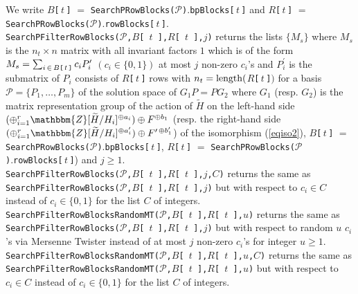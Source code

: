 \documentclass{amsart}
\theoremstyle{plain}
\theoremstyle{definition}
\theoremstyle{remark}
\newcommand{\bZ}{\mathbbm{Z}}\newcommand{\bQ}{\mathbbm{Q}}
\newcounter{sub}\def\tr{\mbox{tr }}
\begin{document}
We write 
$B${\tt [}\,$t$\,{\tt ]} $=$ {\tt SearchPRowBlocks($\mathcal{P}$)}.{\tt bpBlocks[}\,$t$\,{\tt ]} and 
$R${\tt [}\,$t$\,{\tt ]} $=$ {\tt SearchPRowBlocks($\mathcal{P}$)}.{\tt rowBlocks[}\,$t$\,{\tt ]}.\\

\noindent 
{\tt SearchPFilterRowBlocks($\mathcal{P}$,$B${\tt [}\,$t$\,{\tt ]},$R${\tt [}\,$t$\,{\tt ]},$j$)} 
returns 
the lists $\{M_s\}$ where $M_s$ is the $n_t \times n$ matrix 
with all invariant factors $1$ which is of the form 
$M_s=\sum_{i\,\in\,B\mbox{\tt\scriptsize [}\,t\,\mbox{\tt\scriptsize ]}} c_i P_i^\prime$ $(c_i\in\{0,1\})$ 
at most $j$ non-zero $c_i$'s 
and 
$P_i^\prime$ is the submatrix of $P_i$ consists of 
$R${\tt [}\,$t$\,{\tt ]} rows 
with $n_t={\rm length}($$R${\tt [}\,$t$\,{\tt ]}$)$ 
%
for a basis $\mathcal{P}=\{P_1,\dots,P_m\}$ 
of the solution space of $G_1P=PG_2$ 
where $G_1$ (resp. $G_2$) is the matrix representation group of the action of 
$\widetilde{H}$ 
on the left-hand side $(\oplus_{i=1}^r \bZ[\widetilde{H}/H_i]^{\oplus a_i})\oplus F^{\oplus b_1}$ 
(resp. the right-hand side 
$(\oplus_{i=1}^r \bZ[\widetilde{H}/H_i]^{\oplus a_i^{\prime}})\oplus F^{\prime\,\oplus b_1^{\prime}}$) 
of the isomorphism (\ref{eqiso2}), 
$B${\tt [}\,$t$\,{\tt ]} $=$ {\tt SearchPRowBlocks($\mathcal{P}$)}.{\tt bpBlocks[}\,$t$\,{\tt ]}, 
$R${\tt [}\,$t$\,{\tt ]} $=$ {\tt SearchPRowBlocks($\mathcal{P}$)}.{\tt rowBlocks[}\,$t$\,{\tt ]}) 
and $j\geq 1$.\\

\noindent 
{\tt SearchPFilterRowBlocks($\mathcal{P}$,$B${\tt [}\,$t$\,{\tt ]},$R${\tt [}\,$t$\,{\tt ]},$j$,$C$)} returns the same as\\ 
{\tt SearchPFilterRowBlocks($\mathcal{P}$,$B${\tt [}\,$t$\,{\tt ]},$R${\tt [}\,$t$\,{\tt ]},$j$)} 
but with respect to $c_i\in C$ instead of $c_i\in\{0,1\}$ 
for the list $C$ of integers.\\

\noindent 
{\tt SearchPFilterRowBlocksRandomMT($\mathcal{P}$,$B${\tt [}\,$t$\,{\tt ]},$R${\tt [}\,$t$\,{\tt ]},$u$)} returns the same as\\ 
{\tt SearchPFilterRowBlocks($\mathcal{P}$,$B${\tt [}\,$t$\,{\tt ]},$R${\tt [}\,$t$\,{\tt ]},$j$)} 
but with respect to random $u$ $c_i$'s via Mersenne Twister 
instead of at most $j$ non-zero $c_i$'s 
for integer $u\geq 1$.\\

\noindent 
{\tt SearchPFilterRowBlocksRandomMT($\mathcal{P}$,$B${\tt [}\,$t$\,{\tt ]},$R${\tt [}\,$t$\,{\tt ]},$u$,$C$)} returns the same as\\
{\tt SearchPFilterRowBlocksRandomMT($\mathcal{P}$,$B${\tt [}\,$t$\,{\tt ]},$R${\tt [}\,$t$\,{\tt ]},$u$)} 
but with respect to $c_i\in C$ instead of $c_i\in\{0,1\}$ 
for the list $C$ of integers.\\
\end{document}
